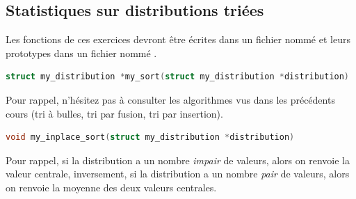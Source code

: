 \documentclass[11pt,a4paper]{article}
\begin{document}


\newpage


\subsection{Statistiques sur distributions triées}

Les fonctions de ces exercices devront être écrites dans un fichier nommé  et leurs prototypes dans un fichier nommé  .



\begin{lstlisting}[language=C,morekeywords={floor,ceil}]
struct my_distribution *my_sort(struct my_distribution *distribution) \end{lstlisting}



Pour rappel, n'hésitez pas à consulter les algorithmes vus dans les précédents cours (tri à bulles, tri par fusion, tri par insertion).

\medskip

\begin{lstlisting}[language=C,morekeywords={floor,ceil}]
void my_inplace_sort(struct my_distribution *distribution) \end{lstlisting}



Pour rappel, si la distribution a un nombre \textit{impair} de valeurs, alors on renvoie la valeur centrale, inversement, si la distribution a un nombre \textit{pair} de valeurs, alors on renvoie la moyenne des deux valeurs centrales.
\end{document}
